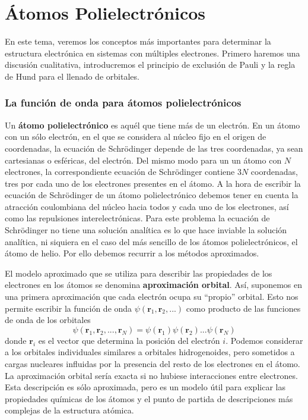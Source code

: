 \chapter{Átomos Polielectrónicos}
En este tema, veremos los conceptos más importantes para determinar 
la estructura electrónica en sistemas con múltiples electrones. Primero 
haremos una discusión cualitativa, introducremos el principio de 
exclusión de Pauli y la regla de Hund para el llenado de orbitales.

\subsection{La función de onda para átomos polielectrónicos}
Un \textbf{átomo polielectrónico} es aquél que tiene más de un electrón.
En un átomo con un sólo electrón, en el que se considera al núcleo
fijo en el origen de coordenadas, la ecuación de Schrödinger depende
de las tres coordenadas, ya sean cartesianas o esféricas, del electrón.
Del mismo modo para un un átomo con $N$ electrones, la correspondiente
ecuación de Schrödinger contiene $3N$ coordenadas, tres por cada uno 
de los electrones presentes en el átomo. A la hora de escribir la 
ecuación de Schrödinger de un átomo polielectrónico debemos tener 
en cuenta la atracción coulombiana del núcleo hacia todos y cada 
uno de los electrones, así como las repulsiones interelectrónicas.
Para este problema la ecuación de Schrödinger no tiene una solución 
analítica es lo que hace inviable la solución analítica, ni siquiera
en el caso del más sencillo de los átomos polielectrónicos, el átomo de 
helio. Por ello debemos recurrir a los métodos aproximados.

El modelo aproximado que se utiliza para describir las propiedades 
de los electrones en los átomos se denomina \textbf{aproximación orbital}. 
Así, suponemos en una primera aproximación que cada electrón ocupa su
“propio” orbital. Esto nos permite escribir la función
de onda $\psi(\mathbf{r}_1,\mathbf{r}_2,...)$ como producto de las
funciones de onda de los orbitales
\begin{equation}
    \psi(\mathbf{r}_1, \mathbf{r}_2, ..., \mathbf{r}_N) = \psi(\mathbf{r}_1)\psi(\mathbf{r}_2)...\psi(\mathbf{r}_ N)
\end{equation}
donde $\mathbf{r}_i$ es el vector que determina la posición del electrón $i$.
Podemos considerar a los orbitales individuales similares a orbitales
hidrogenoides, pero sometidos a cargas nucleares influidas por la 
presencia del resto de los electrones en el átomo. La aproximación 
orbital sería exacta si no hubiese interacciones entre electrones.
Esta descripción es sólo aproximada, pero es un modelo útil para explicar
las propiedades químicas de los átomos y el punto de partida de 
descripciones más complejas de la estructura atómica. 

